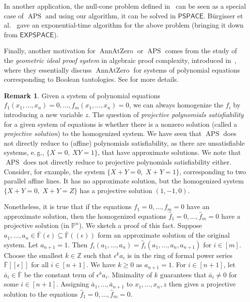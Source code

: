 \documentclass[11pt]{article}
\numberwithin{equation}{section}
\theoremstyle{definition}
\newtheorem{remark}[theorem]{Remark}
\theoremstyle{plain}
\newcommand{\Z}{\mathbb Z}
\newcommand{\cclass}[1]{\textsf{#1}}
\newcommand{\eg}{e.\,g.}
\newcommand{\F}{\mathbb{F}}
\newcommand{\proj}{\mathbb{P}}
\newcommand{\PSPACE}{\cclass{PSPACE}\xspace}  %
\newcommand{\EXPSPACE}{\cclass{EXPSPACE}\xspace} %
\DeclareMathOperator{\APS}{\mathrm{APS}\xspace} %
\DeclareMathOperator{\AnnAtZero}{\mathrm{AnnAtZero}\xspace} %
\begin{document}
In another application, the null-cone problem defined in~\cite{brgisser_et_al:LIPIcs:2018:8351} can be seen as a special case of $\APS$ and using our algorithm, it can be solved in $\PSPACE$. B\"urgisser et al.~\cite{brgisser_et_al:LIPIcs:2018:8351} gave an 
%
exponential-time  %
algorithm for the above problem (bringing it down from
%
$\EXPSPACE$).   %
%

Finally, another motivation for $\AnnAtZero$ or $\APS$ comes from the study of
the  %
\emph{geometric ideal proof system} in algebraic proof complexity, introduced in~\cite{grochow2018circuit}, where they essentially discuss $\AnnAtZero$ for systems of polynomial equations corresponding to Boolean tautologies.
See \cite[Appendix B]{grochow2018circuit} for more details.


%

\smallskip
\noindent
%
%
\begin{remark}
Given a system of polynomial equations $f_1(x_1, \ldots, x_n)=0,\ldots,f_m(x_1, \ldots, x_n)=0$, we can always homogenize
%
the $f_i$  %
by introducing a new variable $z$. The question of \emph{projective polynomials satisfiability} for a given system of equations is whether there is a nonzero solution  (called a \emph{projective solution}) to the homogenized system. We have seen that $\APS$ does not directly reduce to (affine) polynomials satisfiability, as there are unsatisfiable systems, \eg, $\{X=0,~XY=1\}$, that have approximate solutions. We note that $\APS$ does not directly reduce to projective polynomials satisfiability
%
either.  Consider, for example,  %
the system $\{X+Y=0,\;X+Y=1\}$, corresponding to two parallel affine lines. It has no approximate solution, but the homogenized system $\{X+Y=0,\; X+Y=Z\}$ has a projective solution $(1, -1, 0)$. 

Nonetheless, it is true that if the equations $f_1=0, \dots, f_m=0$ have an approximate solution, then the homogenized equations $\hat{f}_1=0,\dots,\hat{f}_m=0$  have a projective solution (in $\proj^n$). We sketch a proof
%
of    %
this fact. %
Suppose $a_1,\dots,a_n \in \overline{\F}(\epsilon)\subseteq  \overline{\F}((\epsilon))$ form an approximate solution of the original system.
%
 Let $a_{n+1}=1$.
Then   $f_i(a_1,\dots,a_n)=\hat{f}_{i}(a_1,\dots,a_n,a_{n+1})$ for $i\in [m]$.
Choose the smallest $k\in\Z$ such that $\epsilon^k a_i$ is in the ring of formal power series $\overline{\F}[[\epsilon]]$ for all $i\in [n+1]$.
We have $k\geq 0$ as $a_{n+1}=1$. 
For $i\in [n+1]$, let $\bar{a}_i\in \overline{\F}$ be the constant term of $\epsilon^k a_i$.
Minimality of $k$ guarantees that   $\bar{a}_i\neq 0$  for some $i\in [n+1]$.
Assigning $\bar{a}_1,\dots,\bar{a}_{n+1}$ to $x_1,\dots,x_n,z$ then gives a projective solution to the equations $\hat{f}_1=0,\dots,\hat{f}_m=0$.
\end{remark}  %
\end{document}
